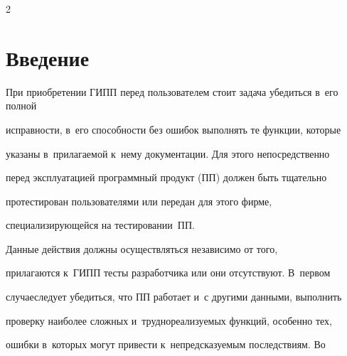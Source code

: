      




  


\vspace*{-4pt}













\thispagestyle{headings}





\begin{multicols}{2}





\label{st\stat}


     


\section{Введение}





    При приобретении ГИПП перед пользователем стоит задача убедиться в~его полной 


исправности, в~его способности без ошибок выполнять те функции, которые 


указаны в~прилагаемой к~нему документации. Для этого непосредственно 


перед эксплуатацией программный продукт (ПП) должен быть тщательно 


протестирован пользователями или передан для этого фирме, 


специализирующейся на тестировании~ПП.


    


    Данные действия должны осуществляться независимо от того, 


прилагаются к~ГИПП тесты разработчика или они отсутствуют. В~первом 


случае\linebreak следует убедиться, что ПП работает и~с другими данными, выполнить 


проверку наиболее сложных и~труднореализуемых функций, особенно тех, 


ошибки в~которых могут привести к~непредсказуемым последствиям. Во 



\end{multicols}
